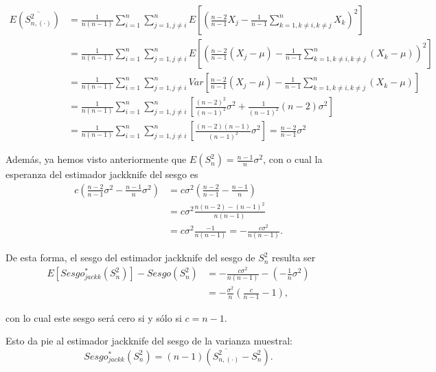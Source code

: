 \documentclass[]{book}
\theoremstyle{definition}
\theoremstyle{definition}
\theoremstyle{definition}
\theoremstyle{remark}
\begin{document}
\[\begin{aligned}
E\left( \overline{S_{n,(\cdot)}^2} \right) 
&=\frac{1}{n\left(
n-1 \right)}\sum_{i=1}^{n}\sum_{j=1,j\neq i}^{n}E\left[ \left( \frac{n-2}{n-1
}X_j-\frac{1}{n-1}\sum_{k=1,k\neq i,k\neq j}^{n}X_{k} \right)^2\right] \\
&=\frac{1}{n\left( n-1 \right)}\sum_{i=1}^{n}\sum_{j=1,j\neq i}^{n}E\left[
\left( \frac{n-2}{n-1}\left( X_j-\mu \right) -\frac{1}{n-1}\sum_{k=1,k\neq
i,k\neq j}^{n}\left( X_{k}-\mu \right) \right)^2\right] \\
&=\frac{1}{n\left( n-1 \right)}\sum_{i=1}^{n}\sum_{j=1,j\neq i}^{n}Var\left[ 
\frac{n-2}{n-1}\left( X_j-\mu \right) -\frac{1}{n-1}\sum_{k=1,k\neq
i,k\neq j}^{n}\left( X_{k}-\mu \right) \right] \\
&=\frac{1}{n\left( n-1 \right)}\sum_{i=1}^{n}\sum_{j=1,j\neq i}^{n}\left[ 
\frac{\left( n-2 \right)^2}{\left( n-1 \right)^2}\sigma^2+\frac{1}{
\left( n-1 \right)^2}\left( n-2 \right) \sigma^2\right] \\
&=\frac{1}{n\left( n-1 \right)}\sum_{i=1}^{n}\sum_{j=1,j\neq i}^{n}\left[ 
\frac{\left( n-2 \right) \left( n-1 \right)}{\left( n-1 \right)^2}\sigma
^2\right] =\frac{n-2}{n-1}\sigma^2
\end{aligned}\]

Además, ya hemos visto anteriormente que
\(E\left( S_n^2 \right) = \frac{n-1}{n}\sigma^2\), con o cual la
esperanza del estimador jackknife del sesgo es \[\begin{aligned}
c\left( \frac{n-2}{n-1}\sigma^2-\frac{n-1}{n}\sigma^2 \right)
&= c\sigma^2\left( \frac{n-2}{n-1}-\frac{n-1}{n} \right) \\
&= c\sigma^2\frac{n\left( n-2 \right) -\left( n-1 \right)^2}{n\left( n-1 \right)} \\
&= c\sigma^2\frac{-1}{n\left( n-1 \right)}
=-\frac{c\sigma^2}{n\left(n-1 \right)}.
\end{aligned}\]

De esta forma, el sesgo del estimador jackknife del sesgo de \(S_n^2\)
resulta ser \[\begin{aligned}
E\left[ Sesgo_{jackk}^{\ast}\left( S_n^2 \right) \right] 
-Sesgo\left(S_n^2 \right) &= -\frac{c\sigma^2}{n\left( n-1 \right)}
-\left( -\frac{1}{n}\sigma^2 \right) \\
&= -\frac{\sigma^2}{n}\left( \frac{c}{n-1}-1 \right),
\end{aligned}\]

con lo cual este sesgo será cero si y sólo si \(c=n-1\).

Esto da pie al estimador jackknife del sesgo de la varianza muestral:
\[Sesgo_{jackk}^{\ast}\left( S_n^2 \right) =\left( n-1 \right) \left( 
\overline{S_{n,(\cdot)}^2}-S_n^2 \right).\]
\end{document}

